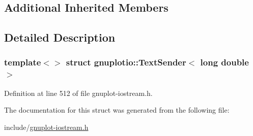 \subsection*{Additional Inherited Members}


\subsection{Detailed Description}
\subsubsection*{template$<$$>$\newline
struct gnuplotio\+::\+Text\+Sender$<$ long double $>$}



Definition at line 512 of file gnuplot-\/iostream.\+h.



The documentation for this struct was generated from the following file\+:\begin{DoxyCompactItemize}
\item 
include/\hyperlink{gnuplot-iostream_8h}{gnuplot-\/iostream.\+h}\end{DoxyCompactItemize}
